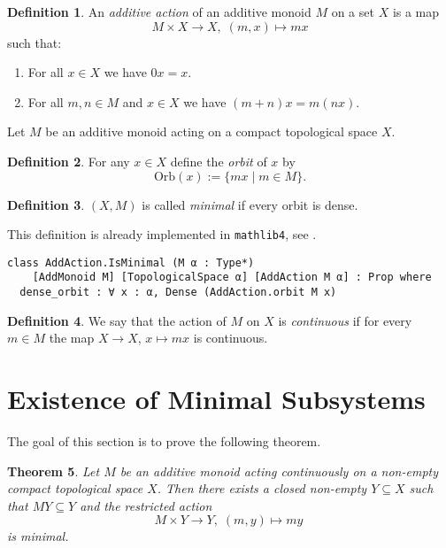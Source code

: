 \documentclass[11pt]{article}
\newtheorem{theorem}{Theorem}[section]
\theoremstyle{definition}              %
\newtheorem{definition}[theorem]{Definition}
\theoremstyle{definition}              %
\theoremstyle{definition}              %
\begin{document}
\begin{definition}
An \emph{additive action} of an additive monoid $M$ on a set $X$ is a map 
\[
M \times X \to X, \; (m,x) \mapsto mx
\]
such that:
\begin{enumerate}
  \item For all $x \in X$ we have $0x = x$.
  \item For all $m,n \in M$ and $x \in X$ we have $(m + n)x = m(n x)$.
\end{enumerate}
\end{definition}

Let $M$ be an additive monoid acting on a compact topological space $X$.

\begin{definition}
For any $x \in X$ define the \emph{orbit} of $x$ by
\[
\mathrm{Orb}(x) := \{mx \mid m \in M\}.
\]
\end{definition}

\begin{definition}
$(X, M)$ is called \emph{minimal} if every orbit is dense.
\end{definition}

This definition is already implemented in \texttt{mathlib4}, see \cite{kudry}.

\begin{lstlisting}
class AddAction.IsMinimal (M α : Type*) 
    [AddMonoid M] [TopologicalSpace α] [AddAction M α] : Prop where
  dense_orbit : ∀ x : α, Dense (AddAction.orbit M x)
\end{lstlisting}

\begin{definition}
We say that the action of $M$ on $X$ is \emph{continuous} if for every $m \in M$ the map $X \to X$, $x \mapsto mx$ is continuous.
\end{definition}
\pagebreak

\section{Existence of Minimal Subsystems}

The goal of this section is to prove the following theorem.

\begin{theorem}\label{thm:existence-minimal-subsystem}\label{thm2}
Let $M$ be an additive monoid acting continuously on a non-empty compact topological space $X$. Then there exists a closed non-empty $Y \subseteq X$ such that $M Y \subseteq Y$ and the restricted action 
\[
M \times Y \to Y, \; (m,y) \mapsto my\
\]
is minimal.
\end{theorem}
\end{document}
